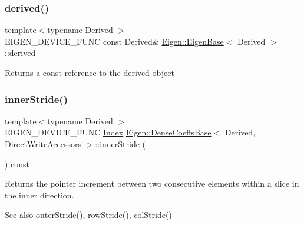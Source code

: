 \subsubsection{\texorpdfstring{derived()}{derived()}\hspace{0.1cm}{\footnotesize\ttfamily [2/2]}}
{\footnotesize\ttfamily template$<$typename Derived $>$ \\
E\+I\+G\+E\+N\+\_\+\+D\+E\+V\+I\+C\+E\+\_\+\+F\+U\+NC const Derived\& \mbox{\hyperlink{struct_eigen_1_1_eigen_base}{Eigen\+::\+Eigen\+Base}}$<$ Derived $>$\+::derived\hspace{0.3cm}{\ttfamily [inline]}}

\begin{DoxyReturn}{Returns}
a const reference to the derived object 
\end{DoxyReturn}
\mbox{\label{class_eigen_1_1_dense_coeffs_base_3_01_derived_00_01_direct_write_accessors_01_4_a28016205b69c3df8152680fea9390937}} 
\subsubsection{\texorpdfstring{innerStride()}{innerStride()}}
{\footnotesize\ttfamily template$<$typename Derived $>$ \\
E\+I\+G\+E\+N\+\_\+\+D\+E\+V\+I\+C\+E\+\_\+\+F\+U\+NC \mbox{\hyperlink{struct_eigen_1_1_eigen_base_a554f30542cc2316add4b1ea0a492ff02}{Index}} \mbox{\hyperlink{class_eigen_1_1_dense_coeffs_base}{Eigen\+::\+Dense\+Coeffs\+Base}}$<$ Derived, Direct\+Write\+Accessors $>$\+::inner\+Stride (\begin{DoxyParamCaption}{ }\end{DoxyParamCaption}) const\hspace{0.3cm}{\ttfamily [inline]}}

\begin{DoxyReturn}{Returns}
the pointer increment between two consecutive elements within a slice in the inner direction.
\end{DoxyReturn}
\begin{DoxySeeAlso}{See also}
outer\+Stride(), row\+Stride(), col\+Stride() 
\end{DoxySeeAlso}
\mbox{\label{class_eigen_1_1_dense_coeffs_base_3_01_derived_00_01_direct_write_accessors_01_4_a024394b03623c6ce5a2aab5eb94d78a8}} 
